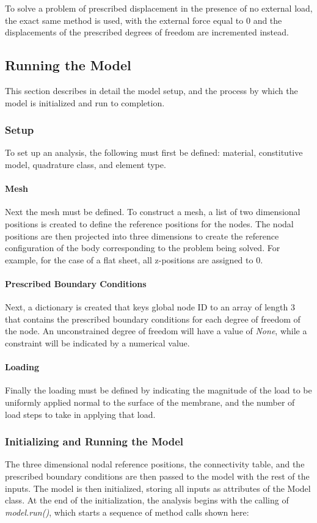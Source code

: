 \documentclass[]{spie}  %
\begin{document}
To solve a problem of prescribed displacement in the presence of no external load, the exact same method is used, with the external force equal to 0 and the displacements of the prescribed degrees of freedom are incremented instead. 

\subsection{Running the Model}
This section describes in detail the model setup, and the process by which the model is initialized and run to completion. 

\subsubsection{Setup}
To set up an analysis, the following must first be defined: material, constitutive model, quadrature class, and element type. 

\paragraph{Mesh}
Next the mesh must be defined. To construct a mesh, a list of two dimensional positions is created to define the reference positions for the nodes. The nodal positions are then projected into three dimensions to create the reference configuration of the body corresponding to the problem being solved. For example, for the case of a flat sheet, all z-positions are assigned to 0. 

\paragraph{Prescribed Boundary Conditions}
Next, a dictionary is created that keys global node ID to an array of length 3 that contains the prescribed boundary conditions for each degree of freedom of the node. An unconstrained degree of freedom will have a value of \textit{None}, while a constraint will be indicated by a numerical value. 

\paragraph{Loading}
Finally the loading must be defined by indicating the magnitude of the load to be uniformly applied normal to the surface of the membrane, and the number of load steps to take in applying that load.  

\subsubsection{Initializing and Running the Model}
The three dimensional nodal reference positions, the connectivity table, and the prescribed boundary conditions are then passed to the model with the rest of the inputs. The model is then initialized, storing all inputs as attributes of the Model class. At the end of the initialization, the analysis begins with the calling of \textit{model.run()}, which starts a sequence of method calls shown here:
\end{document}
